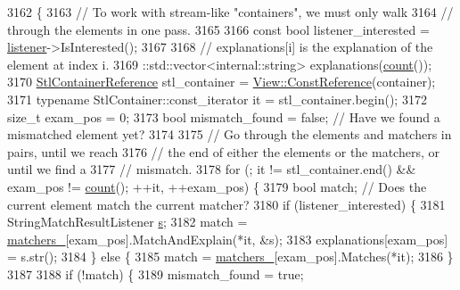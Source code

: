 \begin{DoxyCode}
3162                                                                     \{
3163     \textcolor{comment}{// To work with stream-like "containers", we must only walk}
3164     \textcolor{comment}{// through the elements in one pass.}
3165 
3166     \textcolor{keyword}{const} \textcolor{keywordtype}{bool} listener\_interested = \hyperlink{namespaceinteractive__marker_a0e579ab555212bb5e2c9f8a675b7618a}{listener}->IsInterested();
3167 
3168     \textcolor{comment}{// explanations[i] is the explanation of the element at index i.}
3169     ::std::vector<internal::string> explanations(\hyperlink{classtesting_1_1internal_1_1ElementsAreMatcherImpl_a8a8cf605a9fdc0eb8855fe9ce1aafb1e}{count}());
3170     \hyperlink{classtesting_1_1internal_1_1ElementsAreMatcherImpl_ad5d20c1aa6e8c06c82fe3ac4d68c2278}{StlContainerReference} stl\_container = 
      \hyperlink{classtesting_1_1internal_1_1StlContainerView_a36eccf53329730f6e55c12002128bf25}{View::ConstReference}(container);
3171     \textcolor{keyword}{typename} StlContainer::const\_iterator it = stl\_container.begin();
3172     \textcolor{keywordtype}{size\_t} exam\_pos = 0;
3173     \textcolor{keywordtype}{bool} mismatch\_found = \textcolor{keyword}{false};  \textcolor{comment}{// Have we found a mismatched element yet?}
3174 
3175     \textcolor{comment}{// Go through the elements and matchers in pairs, until we reach}
3176     \textcolor{comment}{// the end of either the elements or the matchers, or until we find a}
3177     \textcolor{comment}{// mismatch.}
3178     \textcolor{keywordflow}{for} (; it != stl\_container.end() && exam\_pos != \hyperlink{classtesting_1_1internal_1_1ElementsAreMatcherImpl_a8a8cf605a9fdc0eb8855fe9ce1aafb1e}{count}(); ++it, ++exam\_pos) \{
3179       \textcolor{keywordtype}{bool} match;  \textcolor{comment}{// Does the current element match the current matcher?}
3180       \textcolor{keywordflow}{if} (listener\_interested) \{
3181         StringMatchResultListener \hyperlink{namespaceservice__node__3_aa976421a49e0b54f23833423400849ae}{s};
3182         match = \hyperlink{classtesting_1_1internal_1_1ElementsAreMatcherImpl_aefcf41a7cfe74274c68272a67fb94e9f}{matchers\_}[exam\_pos].MatchAndExplain(*it, &s);
3183         explanations[exam\_pos] = s.str();
3184       \} \textcolor{keywordflow}{else} \{
3185         match = \hyperlink{classtesting_1_1internal_1_1ElementsAreMatcherImpl_aefcf41a7cfe74274c68272a67fb94e9f}{matchers\_}[exam\_pos].Matches(*it);
3186       \}
3187 
3188       \textcolor{keywordflow}{if} (!match) \{
3189         mismatch\_found = \textcolor{keyword}{true};

\end{DoxyCode}
